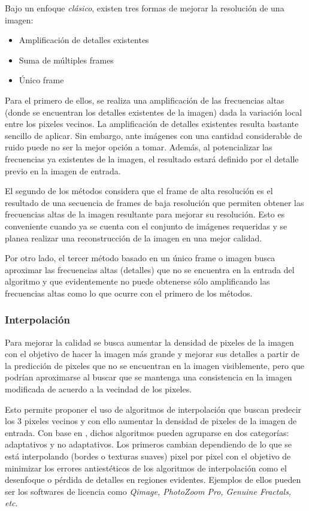 \noindent
Bajo un enfoque \emph{clásico}, existen tres formas de mejorar la resolución 
de una imagen:

\begin{itemize}
    \item Amplificación de detalles existentes
    \item Suma de múltiples frames
    \item Único frame
\end{itemize}

Para el primero de ellos, se realiza una amplificación de las frecuencias altas
(donde se encuentran los detalles existentes de la imagen) dada la variación local
entre los pixeles vecinos. 
La amplificación de detalles existentes resulta bastante 
sencillo de aplicar. Sin embargo, ante imágenes con una cantidad considerable de
ruido puede no ser la mejor opción a tomar. Además, al potencializar las 
frecuencias ya existentes de la imagen, el resultado estará definido por el detalle
previo en la imagen de entrada. 

El segundo de los métodos considera que el frame de alta resolución es el resultado
de una secuencia de frames de baja resolución que permiten obtener las frecuencias 
altas de la imagen resultante para mejorar su resolución. Esto es conveniente cuando
ya se cuenta con el conjunto de imágenes requeridas y se planea realizar una 
reconstrucción de la imagen en una mejor calidad.

Por otro lado, el tercer método basado en un único frame o imagen busca aproximar las
frecuencias altas (detalles) que no se encuentra en la entrada del algoritmo y que evidentemente
no puede obtenerse sólo amplificando las frecuencias altas como lo que ocurre con 
el primero de los métodos. 

\subsubsection{Interpolación}
\noindent
Para mejorar la calidad se busca aumentar la densidad de pixeles de la imagen con el objetivo
de hacer la imagen más grande y mejorar sus detalles a partir de la predicción de 
pixeles que no se encuentran en la imagen visiblemente, pero que podrían aproximarse
al buscar que se mantenga una consistencia en la imagen modificada de acuerdo a la
vecindad de los pixeles. 

Esto permite proponer el uso de algoritmos de interpolación que buscan predecir los  3
pixeles vecinos y con ello aumentar la densidad de pixeles de la imagen de entrada. 
Con base en \cite{interpolation_cambridge}, dichos algoritmos pueden agruparse en dos
categorías: adaptativos y no adaptativos. Los primeros cambian dependiendo de lo que
se está interpolando (bordes o texturas suaves) pixel por pixel con el objetivo de
minimizar los errores antiestéticos de los algoritmos de interpolación como el
desenfoque o pérdida de detalles en regiones evidentes. Ejemplos de ellos pueden
ser los softwares de licencia como \emph{Qimage, PhotoZoom Pro, Genuine Fractals, etc}. 

